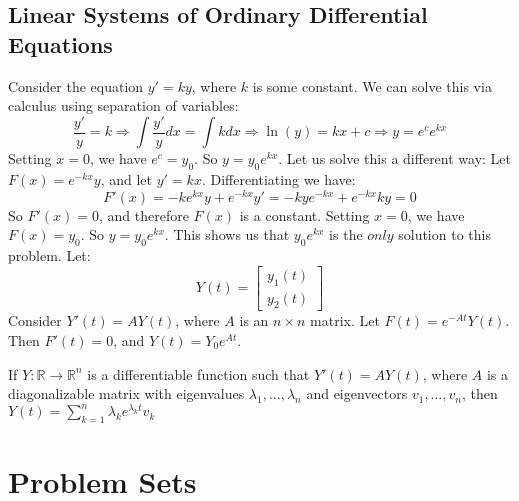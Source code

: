 \documentclass[crop=false,class=book,oneside]{standalone}
\begin{document}
        \subsection{Linear Systems of Ordinary Differential Equations}
        Consider the equation $y' = ky$, where $k$ is some constant. We can solve this via calculus using separation of variables:
        \begin{equation*}
            \frac{y'}{y} = k\Rightarrow \int \frac{y'}{y}dx = \int kdx \Rightarrow \ln(y) = kx+c \Rightarrow y = e^c e^{kx}    
        \end{equation*}
        Setting $x=0$, we have $e^c = y_0$. So $y = y_0e^{kx}$. Let us solve this a different way: Let $F(x) = e^{-kx}y$, and let $y'=kx$. Differentiating we have:
        \begin{equation*}
            F'(x)=-ke^{kx}y+e^{-kx}y'=-kye^{-kx}+e^{-kx}ky=0    
        \end{equation*}
        So $F'(x) = 0$, and therefore $F(x)$ is a constant. Setting $x=0$, we have $F(x) = y_0$. So $y = y_0e^{kx}$. This shows us that $y_0e^{kx}$ is the $only$ solution to this problem. Let:
        \begin{equation*}
            Y(t) = \begin{bmatrix} y_1(t) \\ y_2(t)\end{bmatrix}    
        \end{equation*}
        Consider $Y'(t) = AY(t)$, where $A$ is an $n\times n$ matrix. Let $F(t) = e^{-At}Y(t)$. Then $F'(t) = 0$, and $Y(t) = Y_0 e^{At}$.
        \begin{theorem}
        If $Y:\mathbb{R}\rightarrow \mathbb{R}^n$ is a differentiable function such that $Y'(t) = AY(t)$, where $A$ is a diagonalizable matrix with eigenvalues $\lambda_1,\hdots, \lambda_n$ and eigenvectors $v_1,\hdots, v_n$, then $Y(t) = \sum_{k=1}^{n} \lambda_k e^{\lambda_k t}v_k$
        \end{theorem}
    \section{Problem Sets}
\end{document}

